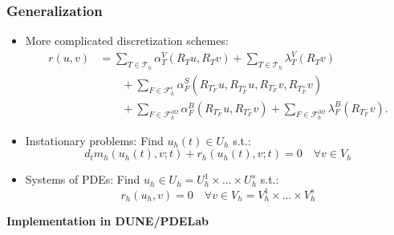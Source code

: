 \documentclass[ignorenonframetext,11pt]{beamer}
\theoremstyle{definition}
\begin{document}
\begin{frame}
\frametitle{Generalization}
\begin{itemize}
\item More complicated discretization schemes:
\begin{equation*}
\begin{split}
r(u,v) &=
\sum_{T\in\mathcal{T}_h} \alpha_T^V(R_T u, R_T v)
+ \sum_{T\in\mathcal{T}_h} \lambda_T^V(R_T v) \\
&\qquad+ \sum_{F\in\mathcal{F}_h^i} \alpha_F^S(R_{T_F^-} u,R_{T_F^+} u, R_{T_F^-} v, R_{T_F^+} v)\\
&\qquad+ \sum_{F\in\mathcal{F}_h^{\partial\Omega}} \alpha_F^B(R_{T_F^-} u, R_{T_F^-} v)
+ \sum_{F\in\mathcal{F}_h^{\partial\Omega}} \lambda_F^B(R_{T_F^-} v) .
\end{split}
\end{equation*}
\item Instationary problems: Find $u_h(t)\in U_h$ s.t.:
\begin{equation*}
d_t m_h(u_h(t),v;t) + r_h(u_h(t),v;t) = 0
\quad \forall v\in V_h
\end{equation*}
\item Systems of PDEs: Find $u_h\in U_h=U_h^1\times \ldots \times U_h^s$ s.t.:
\begin{equation*}
r_h(u_h,v)=0
\quad \forall v\in V_h=V_h^1\times\ldots\times V_h^s
\end{equation*}
\end{itemize}
\end{frame}


\begin{frame}
\begin{center}
\Large\textbf{Implementation in DUNE/PDELab}
\end{center}
\end{frame}
\end{document}
